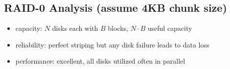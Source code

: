 \documentclass[8pt,a4paper,landscape]{extarticle}
\begin{document}
\begin{multicols*}{3}
\section*{RAID-0 Analysis (assume 4KB chunk size)}
\begin{itemize}
\item capacity: $N$ disks each with $B$ blocks, $N\cdot B$ useful capacity
\item reliability: perfect striping but any disk failure leads to data loss
\item performance: excellent, all disks utilized often in parallel
\end{itemize}
\end{multicols*}
\end{document}
